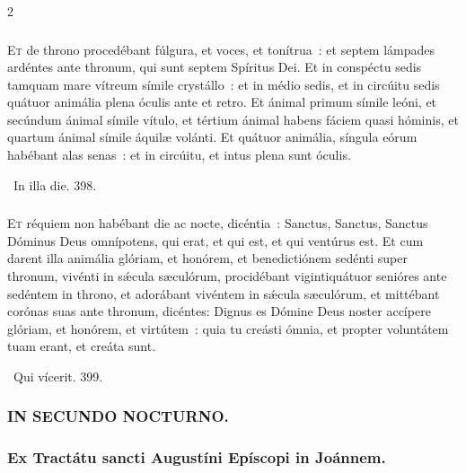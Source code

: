 \documentclass[9pt,twoside]{extarticle}
\begin{document}
\begin{multicols}{2}
\subsubsection*{\center {}}
\lettrine{E}t de throno procedébant fúlgura, et voces, et tonítrua~: et septem lámpades ardéntes ante thronum, qui sunt septem Spíritus Dei.
Et in conspéctu sedis tamquam mare vítreum símile crystállo~: et in médio sedis, et in circúitu sedis quátuor animália plena óculis ante et retro.
Et ánimal primum símile leóni, et secúndum ánimal símile vítulo, et tértium ánimal habens fáciem quasi hóminis, et quartum ánimal símile áquilæ volánti.
Et quátuor animália, síngula eórum habébant alas senas~: et in circúitu, et intus plena sunt óculis.

\begin{tightlist}{}
\item {}~In illa die. 398.
\end{tightlist}

\subsubsection*{\center {}}
\lettrine{E}t réquiem non habébant die ac nocte, dicéntia~: Sanctus, Sanctus, Sanctus Dóminus Deus omnípotens, qui erat, et qui est, et qui ventúrus est.
Et cum darent illa animália glóriam, et honórem, et benedictiónem sedénti super thronum, vivénti in sǽcula sæculórum,
procidébant vigintiquátuor senióres ante sedéntem in throno, et adorábant vivéntem in sǽcula sæculórum, et mittébant corónas suas ante thronum, dicéntes:
Dignus es Dómine Deus noster accípere glóriam, et honórem, et virtútem~: quia tu creásti ómnia, et propter voluntátem tuam erant, et creáta sunt.

\begin{tightlist}{}
\item {}~Qui vícerit. 399.
\end{tightlist}

\subsubsection*{\center \textsc{IN SECUNDO NOCTURNO.}}
\subsubsection*{\center Ex Tractátu sancti Augustíni Epíscopi in Joánnem.}

\end{multicols}
\end{document}
